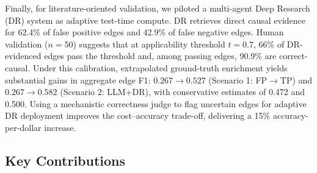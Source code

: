 Finally, for literature-oriented validation, we piloted a multi-agent Deep Research (DR) system as adaptive test-time compute. DR retrieves direct causal evidence for 62.4\% of false positive edges and 42.9\% of false negative edges. Human validation (\(n=50\)) suggests that at applicability threshold \(t=0.7\), 66\% of DR-evidenced edges pass the threshold and, among passing edges, 90.9\% are correct-causal. Under this calibration, extrapolated ground-truth enrichment yields substantial gains in aggregate edge F1: \(0.267 \to 0.527\) (Scenario 1: FP\(\to\)TP) and \(0.267 \to 0.582\) (Scenario 2: LLM+DR), with conservative estimates of 0.472 and 0.500. Using a mechanistic correctness judge to flag uncertain edges for adaptive DR deployment improves the cost--accuracy trade-off, delivering a 15\% accuracy-per-dollar increase.

\subsection{Key Contributions}
\label{sec:conclusion_contributions}

